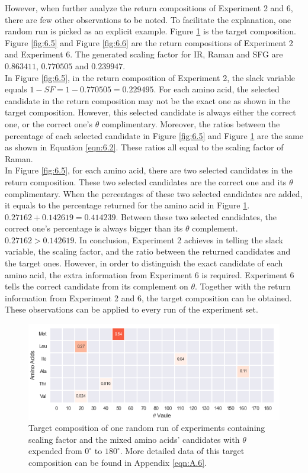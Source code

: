 However, when further analyze the return compositions of Experiment 2 and 6, there are few other observations to be noted. To facilitate the explanation, one random run is picked as an explicit example. Figure \ref{fig:6.4} is the target composition. Figure \ref{fig:6.5} and Figure \ref{fig:6.6} are the return compositions of Experiment 2 and Experiment 6. The generated scaling factor for IR, Raman and SFG are $0.863411$, $0.770505$ and $0.239947$. \\

In Figure \ref{fig:6.5}, in the return composition of Experiment 2, the slack variable equals $1-SF = 1-0.770505 = 0.229495$. For each amino acid, the selected candidate in the return composition may not be the exact one as shown in the target composition. However, this selected candidate is always either the correct one, or the correct one's $\theta$ complimentary. Moreover, the ratios between the percentage of each selected candidate in Figure \ref{fig:6.5} and Figure \ref{fig:6.4} are the same as shown in Equation \ref{eqn:6.2}. These ratios all equal to the scaling factor of Raman. \\

In Figure \ref{fig:6.5}, for each amino acid, there are two selected candidates in the return composition. These two selected candidates are the correct one and its $\theta$ complimentary. When the percentages of these two selected candidates are added, it equals to the percentage returned for the amino acid in Figure \ref{fig:6.4}. $0.27162 + 0.142619 = 0.414239$. Between these two selected candidates, the correct one's percentage is always bigger than its $\theta$ complement. $0.27162 > 0.142619$. In conclusion, Experiment 2 achieves in telling the slack variable, the scaling factor, and the ratio between the returned candidates and the target ones. However, in order to distinguish the exact candidate of each amino acid, the extra information from Experiment 6 is required. Experiment 6 tells the correct candidate from its complement on $\theta$. Together with the return information from Experiment 2 and 6, the target composition can be obtained. These observations can be applied to every run of the experiment set.\\


\begin{figure}[!ht] 
\centering
\includegraphics[scale=0.9]{Figures/chapter6_figure_five.png}
\caption{Target composition of  one random run of experiments containing scaling factor and the mixed amino acids' candidates with $\theta$ expended from $0^{\circ}$ to $180^{\circ}$. More detailed data of this target composition can be found in Appendix \ref{eqn:A.6}.} \label{fig:6.4}
\end{figure}

